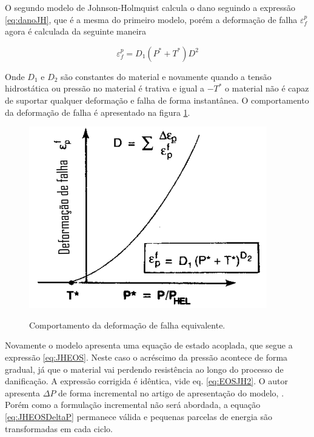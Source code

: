 O segundo modelo de Johnson-Holmquist calcula o dano seguindo a expressão \ref{eq:danoJH}, que é a mesma do primeiro modelo, porém a deformação de falha $ \varepsilon^p_f $ agora é calculada da seguinte maneira

\begin{equation}
    \varepsilon^p_f = D_1(P^* + T^*)D^2
\end{equation}

Onde $ D_1 $ e $ D_2 $ são constantes do material %
e novamente quando a tensão hidrostática ou pressão no material é trativa e igual a $ -T^* $ o material não é capaz de suportar qualquer deformação e falha de forma instantânea. O comportamento da deformação de falha é apresentado na figura \ref{fig:danoJH2}.

\begin{figure}
    \centering
    \caption{Comportamento da deformação de falha equivalente.}
    \includegraphics[width=0.7\linewidth]{images/deffalhaJH2.png} 
    \label{fig:danoJH2}
\end{figure}

Novamente o modelo apresenta uma equação de estado acoplada, que segue a expressão \ref{eq:JHEOS}. Neste caso o acréscimo da pressão acontece de forma gradual, já que o material vai perdendo resistência ao longo do processo de danificação. A expressão corrigida é idêntica, vide eq. \ref{eq:EOSJH2}. O autor apresenta $ \Delta P $ de forma incremental no artigo de apresentação do modelo, \cite{johnson_holmquist_1994} . Porém como a formulação incremental não será abordada, a equação \ref{eq:JHEOSDeltaP} permanece válida e pequenas parcelas de energia são transformadas em cada ciclo. 


 
 
 
 
 
 
 
 
 







